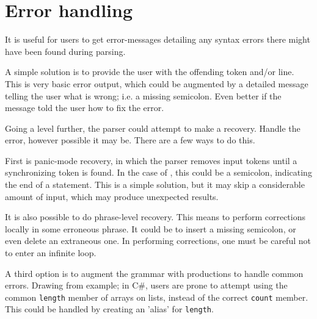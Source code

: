 \section{Error handling}
It is useful for users to get error-messages detailing any syntax errors there might have been found during parsing.

A simple solution is to provide the user with the offending token and/or line. This is very basic error output, which could be augmented by a detailed message telling the user what is wrong; i.e. a missing semicolon. Even better if the message told the user how to fix the error.

Going a level further, the parser could attempt to make a recovery. Handle the error, however possible it may be. There are a few ways to do this.

First is panic-mode recovery, in which the parser removes input tokens until a synchronizing token is found. In the case of \dazel{}, this could be a semicolon, indicating the end of a statement. This is a simple solution, but it may skip a considerable amount of input, which may produce unexpected results.

It is also possible to do phrase-level recovery. This means to perform corrections locally in some erroneous phrase. It could be to insert a missing semicolon, or even delete an extraneous one. In performing corrections, one must be careful not to enter an infinite loop.

A third option is to augment the grammar with productions to handle common errors. Drawing from example; in C\#, users are prone to attempt using the common \texttt{length} member of arrays on lists, instead of the correct \texttt{count} member. This could be handled by creating an 'alias' for \texttt{length}\cite{crafting_a_compiler}.